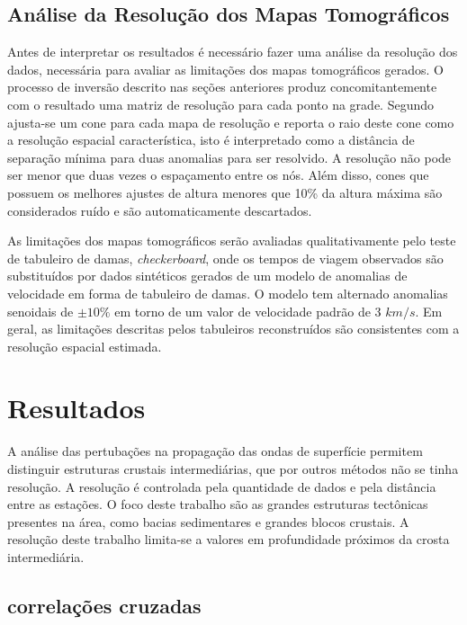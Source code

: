 \subsection{Análise da Resolução dos Mapas Tomográficos}

Antes de interpretar os resultados é necessário fazer uma análise da resolução dos dados, necessária para avaliar as limitações dos mapas tomográficos gerados. O processo de inversão descrito nas seções anteriores produz concomitantemente com o resultado uma matriz de resolução para cada ponto na grade. Segundo \cite{barmin_fast_2001} ajusta-se um cone para cada mapa de resolução e reporta o raio deste cone como a resolução espacial característica, isto é interpretado como a distância de separação mínima para duas anomalias para ser resolvido. A resolução não pode ser menor que duas vezes o espaçamento entre os nós. Além disso, cones que possuem os melhores ajustes de altura menores que 10\% da altura máxima são considerados ruído e são automaticamente descartados.  

As limitações dos mapas tomográficos serão avaliadas qualitativamente pelo teste de tabuleiro de damas, \textit{checkerboard}, onde os tempos de viagem observados são substituídos por dados sintéticos gerados de um modelo de anomalias  de velocidade em forma de tabuleiro de damas. O modelo tem alternado anomalias senoidais de $\pm 10\%$ em torno de um valor de velocidade padrão de 3 $km/s$. Em geral, as limitações descritas pelos tabuleiros reconstruídos são consistentes com a resolução espacial estimada.

\section{Resultados}

A análise das pertubações na propagação das ondas de superfície permitem distinguir estruturas crustais intermediárias, que por outros métodos não se tinha resolução. A resolução é controlada pela quantidade de dados e pela distância entre as estações. O foco deste trabalho são as grandes estruturas tectônicas presentes na área, como bacias sedimentares e grandes blocos crustais. A resolução deste trabalho limita-se a valores em profundidade próximos da crosta intermediária.

\subsection{correlações cruzadas}


